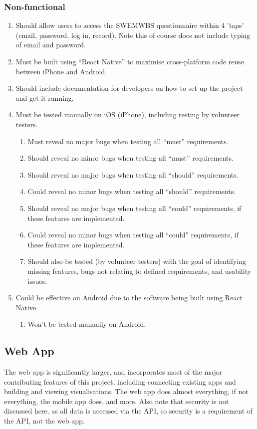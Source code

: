 \documentclass[11pt,openright,a4paper]{report}
\begin{document}
\subsubsection{Non-functional}
\begin{enumerate}
\item Should allow users to access the SWEMWBS questionnaire within 4 'taps' (email, password, log in, record). Note this of course does not include typing of email and password.
\item Must be built using \enquote{React Native} \parencite{reactnative} \parencite{reactnativegit} to maximise cross-platform code reuse between iPhone and Android.
\item Should include documentation for developers on how to set up the project and get it running.
\item Must be tested manually on iOS (iPhone), including testing by volunteer testers.
  \begin{enumerate}
  \item Must reveal no major bugs when testing all \enquote{must} requirements.
  \item Should reveal no minor bugs when testing all \enquote{must} requirements.
  \item Should reveal no major bugs when testing all \enquote{should} requirements.
  \item Could reveal no minor bugs when testing all \enquote{should} requirements.
  \item Should reveal no major bugs when testing all \enquote{could} requirements, if these features are implemented.
  \item Could reveal no minor bugs when testing all \enquote{could} requirements, if these features are implemented.
  \item Should also be tested (by volunteer testers) with the goal of identifying missing features, bugs not relating to defined requirements, and usability issues.
  \end{enumerate}
\item Could be effective on Android due to the software being built using React Native.
  \begin{enumerate}
  \item Won't be tested manually on Android.
  \end{enumerate}
\end{enumerate}

\subsection{Web App}
The web app is significantly larger, and incorporates most of the major contributing features of this project, including connecting existing apps and building and viewing visualisations. The web app does almost everything, if not everything, the mobile app does, and more. Also note that security is not discussed here, as all data is accessed via the API, so security is a requirement of the API, not the web app.
\end{document}
